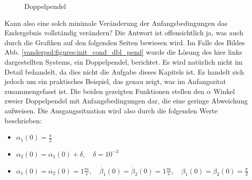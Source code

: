 \begin{figure}
\caption{Doppelpendel\label{vanderpol:figures:doublependulum}}
\end{figure}
\noindent Kann also eine solch minimale Veränderung der Anfangsbedingungen das Endergebnis vollständig verändern? Die Antwort ist offensichtlich ja, was auch durch die Grafiken auf den folgenden Seiten bewiesen wird.
Im Falle des Bildes Abb. \ref{vanderpol:figures:init_cond_dbl_pend} wurde die Lösung des hier links dargestellten Systems, ein Doppelpendel, berichtet. Es wird natürlich nicht im Detail behandelt, da dies nicht die Aufgabe dieses Kapitels ist. Es handelt sich jedoch um ein praktisches Beispiel, das genau zeigt, was im Anfangszitat zusammengefasst ist. Die beiden gezeigten Funktionen stellen den $\alpha$ Winkel zweier Doppelpendel mit Anfangsbedingungen dar, die eine geringe Abweichung aufweisen. Die Ausgangssituation wird also durch die folgenden Werte beschrieben:
\begin{itemize}
\item
$\alpha_1(0) = \frac{\pi}{2}$
\item
$\alpha_2(0) = \alpha_1(0) + \delta, \quad \delta = 10^{-3}$ 
\item
$\dot{\alpha_1}(0) = \dot{\alpha_2}(0)= 1 \frac{m}{s}, \quad \dot{\beta_1}(0) = \dot{\beta_2}(0)= 1 \frac{m}{s}, \quad \beta_1(0)=\beta_2(0)=\frac{\pi}{2}$
\end{itemize}

